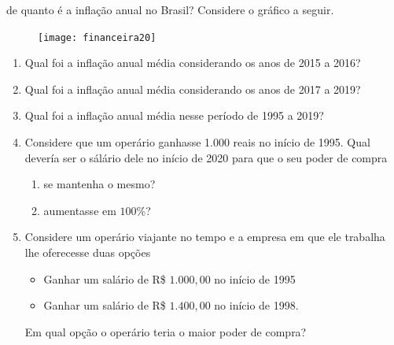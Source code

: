 \begin{task}{de quanto é a inflação anual no Brasil?}
Considere o gráfico a seguir.

\begin{figure}[H]
\centering

\texttt{[image: financeira20]}
\end{figure}

\begin{enumerate}
  \item Qual foi a inflação anual média considerando os anos de 2015 a 2016?
  \item Qual foi a inflação anual média considerando os anos de 2017 a 2019?
  \item Qual foi a inflação anual média nesse período de 1995 a 2019?
  \item Considere que um operário ganhasse 1.000 reais no início de 1995. Qual devería ser o sálário dele no início de 2020 para que o seu poder de compra
  \begin{enumerate}
    \item se mantenha o mesmo?
    \item aumentasse em $100$\%?
  \end{enumerate}
  \item Considere um operário viajante no tempo e a empresa em que ele trabalha lhe oferecesse duas opções
  \begin{itemize}
    \item Ganhar um salário de R\$ $1.000{,}00$ no início de 1995
    \item Ganhar um salário de R\$ $1.400{,}00$ no início de 1998.
  \end{itemize}
  Em qual opção o operário teria o maior poder de compra?
\end{enumerate}
\end{task}


